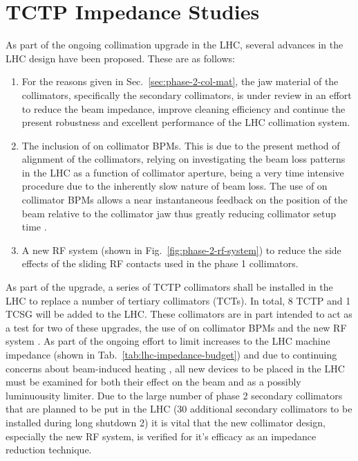 \section{TCTP Impedance Studies}
\label{sec:tctp}

As part of the ongoing collimation upgrade in the LHC, several advances in the LHC design have been proposed. These are as follows:

\begin{enumerate}
\item{For the reasons given in Sec.~\ref{sec:phase-2-col-mat}, the jaw material of the collimators, specifically the secondary collimators, is under review in an effort to reduce the beam impedance, improve cleaning efficiency and continue the present robustness and excellent performance of the LHC collimation system.}
\item{The inclusion of on collimator BPMs. This is due to the present method of alignment of the collimators, relying on investigating the beam loss patterns in the LHC as a function of collimator aperture, being a very time intensive procedure due to the inherently slow nature of beam loss. The use of on collimator BPMs allows a near instantaneous feedback on the position of the beam relative to the collimator jaw thus greatly reducing collimator setup time \cite{Valentino:ColAlignment, Valentino:BPM}.}
\item{A new RF system (shown in Fig.~\ref{fig:phase-2-rf-system}) to reduce the side effects of the sliding RF contacts used in the phase 1 collimators.}
\end{enumerate}

As part of the upgrade, a series of TCTP collimators shall be installed in the LHC to replace a number of tertiary collimators (TCTs). In total, 8 TCTP and 1 TCSG will be added to the LHC. These collimators are in part intended to act as a test for two of these upgrades, the use of on collimator BPMs and the new RF system \cite{Dallocchio:ColBPM}. As part of the ongoing effort to limit increases to the LHC machine impedance (shown in Tab.~\ref{tab:lhc-impedance-budget}) and due to continuing concerns about beam-induced heating \cite{Salvant:Heating, Metral:Heating}, all new devices to be placed in the LHC must be examined for both their effect on the beam and as a possibly luminuousity limiter. Due to the large number of phase 2 secondary collimators that are planned to be put in the LHC (30 additional secondary collimators to be installed during long shutdown 2) it is vital that the new collimator design, especially the new RF system, is verified for it's efficacy as an impedance reduction technique.  

